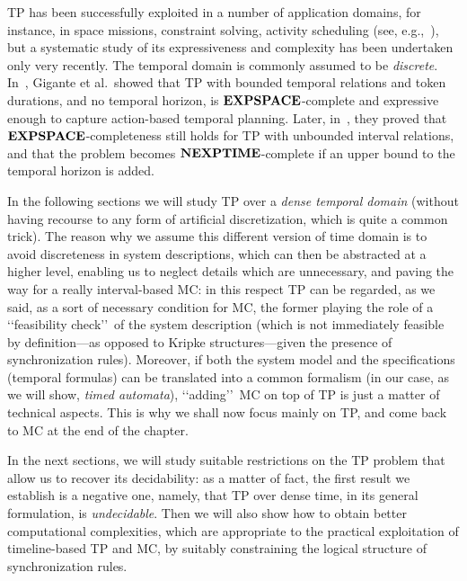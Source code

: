TP has been successfully exploited in a number of application domains, for instance, in space missions, constraint solving, activity scheduling (see, e.g.,~\cite{barreiro2012europa,CestaCFOP07,aspen2010,FrankJ03,JonssonMMRS00,Muscettola94}), but a systematic study of its expressiveness and complexity has been undertaken only very recently. The temporal domain is commonly assumed to be \emph{discrete}.
In~\cite{GiganteMCO16}, Gigante et al.\ showed that TP with bounded temporal relations and token durations, and no temporal horizon, is $\textbf{EXPSPACE}$-complete and  expressive enough to capture action-based temporal planning. Later, in~\cite{GiganteMCO17}, they proved that $\textbf{EXPSPACE}$-completeness still holds for TP with unbounded interval relations, and that the problem becomes $\textbf{NEXPTIME}$-complete if an upper bound to the temporal horizon is added. 

In the following sections we will study 
TP over a \emph{dense temporal domain} 
(without having recourse to any form of artificial discretization, which is quite a common trick).
The reason why we assume this different version of time domain is to avoid discreteness in system descriptions,
which can then be abstracted at a higher level, enabling us to neglect details which are unnecessary, and paving the way for a really interval-based MC:
in this respect TP can be regarded, as we said, as a sort of necessary condition for MC, the former playing the role of a \lq\lq feasibility check\rq\rq\ of the system description (which is not immediately feasible by definition---as opposed to Kripke structures---given the presence of synchronization rules). 
Moreover, if both the system model and the specifications (temporal formulas) can be translated into a common formalism (in our case, as we will show, \emph{timed automata}), \lq\lq adding\rq\rq\ MC on top of TP is just a matter of technical aspects. This is why 
we shall now focus mainly on TP, and come back to MC at the end of the chapter.

In the next sections, we will study suitable restrictions on the TP problem that allow us to recover its decidability: as a matter of fact, the first result we establish is a negative one, 
namely, that TP over dense time, in its general formulation, is \emph{undecidable}. Then we will also show how to obtain better computational complexities, which are appropriate to the practical exploitation of timeline-based TP and MC,  by suitably constraining the logical structure of synchronization rules. 

